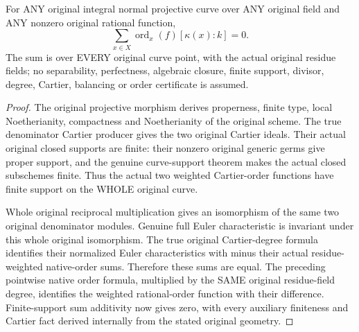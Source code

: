\begin{theorem}
\label{thm:fc-original-curve-principal-weighted-balance}
\leanok
{}
For ANY original integral normal projective curve over ANY original field
and ANY nonzero original rational function,
\[
 \sum_{x\in X} \operatorname{ord}_x(f)[\kappa(x):k]=0.
\]
The sum is over EVERY original curve point, with the actual original
residue fields; no separability, perfectness, algebraic closure, finite
support, divisor, degree, Cartier, balancing or order certificate is
assumed.
\end{theorem}
\begin{proof}
The original projective morphism derives properness, finite type, local
Noetherianity, compactness and Noetherianity of the original scheme. The
true denominator Cartier producer gives the two original Cartier ideals.
Their actual original closed supports are finite: their nonzero original
generic germs give proper support, and the genuine curve-support theorem
makes the actual closed subschemes finite. Thus the actual two weighted
Cartier-order functions have finite support on the WHOLE original curve.

Whole original reciprocal multiplication gives an isomorphism of the
same two original denominator modules. Genuine full Euler characteristic
is invariant under this whole original isomorphism. The true original
Cartier-degree formula identifies their normalized Euler characteristics
with minus their actual residue-weighted native-order sums. Therefore
these sums are equal. The preceding pointwise native order formula,
multiplied by the SAME original residue-field degree, identifies the
weighted rational-order function with their difference. Finite-support
sum additivity now gives zero, with every auxiliary finiteness and Cartier
fact derived internally from the stated original geometry.
\end{proof}
